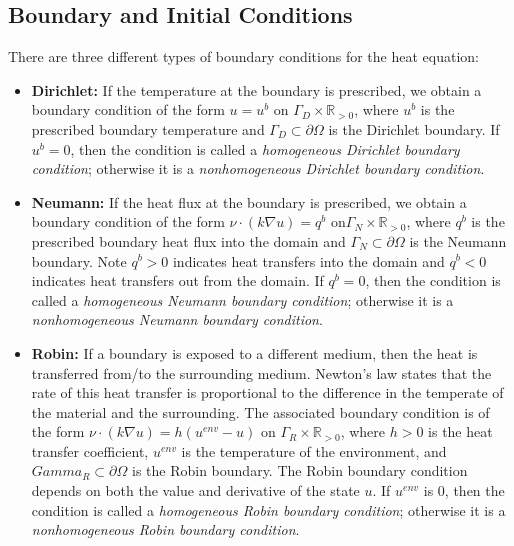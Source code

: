 \documentclass[11pt]{article}
\newcommand{\R}{\mathbb{R}}
\begin{document}
\subsection{Boundary and Initial Conditions}
There are three different types of boundary conditions for the heat equation:
\begin{itemize}
\item \textbf{Dirichlet:} If the temperature at the boundary is prescribed, we obtain a boundary condition of the form $ u = u^b$ on  $\Gamma_D \times \R_{>0}$, where $u^b$ is the prescribed boundary temperature and $\Gamma_D \subset \partial \Omega$ is the Dirichlet boundary. If $u^b = 0$, then the condition is called a \textit{homogeneous Dirichlet boundary condition}; otherwise it is a \textit{nonhomogeneous Dirichlet boundary condition}.
\item \textbf{Neumann:} If the heat flux at the boundary is prescribed, we obtain a boundary condition of the form $\nu\cdot (k\nabla u)=q^b$ on$\Gamma_N \times \R_{>0}$, where $q^b$ is the prescribed boundary heat flux into the domain and $\Gamma_N \subset \partial \Omega$ is the Neumann boundary.  Note $q^b > 0$ indicates heat transfers into the domain and $q^b < 0$ indicates heat transfers out from the domain.  If $q^b = 0$, then the condition is called a \textit{homogeneous Neumann boundary condition}; otherwise it is a \textit{nonhomogeneous Neumann boundary condition}.
\item \textbf{Robin:} If a boundary is exposed to a different medium, then the heat is transferred from/to the surrounding medium.  Newton’s law states that the rate of this heat transfer is proportional to the difference in the temperate of the material and the surrounding. The associated boundary condition is of the form
$\nu\cdot (k\nabla u)= h(u^{env} - u)$ on $\Gamma_R \times \R_{>0}$,
where $h > 0$ is the heat transfer coefficient,  $u^{env}$ is the temperature of the environment, and $Gamma_R \subset \partial \Omega$ is the Robin boundary. The Robin boundary condition depends on both the value and derivative of the state $u$. If $u^{env}$ is 0, then the condition is called a \textit{homogeneous Robin boundary condition}; otherwise it is a \textit{nonhomogeneous Robin boundary condition}.
\end{itemize}
\end{document}
